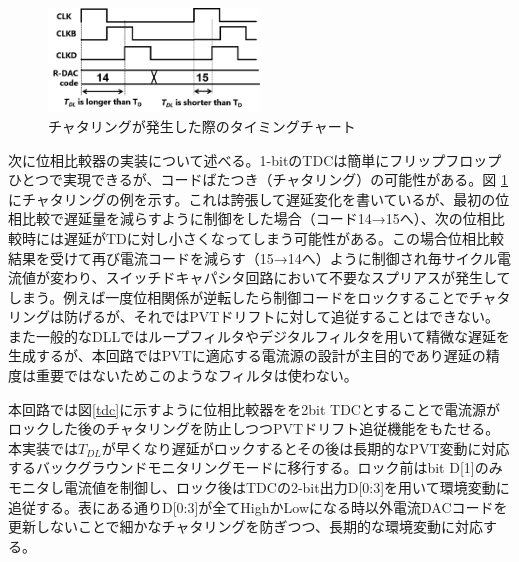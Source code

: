 \documentclass[letterpaper, 10 pt, conference]{ieeeconf}  %
\begin{document}
\begin{figure}[!]
\centering
 \includegraphics[width=0.5\textwidth]{figs/chattering.png}
  \caption{チャタリングが発生した際のタイミングチャート}
\label{chattering}
\end{figure}

次に位相比較器の実装について述べる。1-bitのTDCは簡単にフリップフロップひとつで実現できるが、コードばたつき（チャタリング）の可能性がある。図 \ref{chattering}にチャタリングの例を示す。これは誇張して遅延変化を書いているが、最初の位相比較で遅延量を減らすように制御をした場合（コード14→15へ）、次の位相比較時には遅延がTDに対し小さくなってしまう可能性がある。この場合位相比較結果を受けて再び電流コードを減らす（15→14へ）ように制御され毎サイクル電流値が変わり、スイッチドキャパシタ回路において不要なスプリアスが発生してしまう。例えば一度位相関係が逆転したら制御コードをロックすることでチャタリングは防げるが、それではPVTドリフトに対して追従することはできない。また一般的なDLLではループフィルタ\cite{sidiropoulos1997semidigital}やデジタルフィルタ\cite{kim20172}を用いて精微な遅延を生成するが、本回路ではPVTに適応する電流源の設計が主目的であり遅延の精度は重要ではないためこのようなフィルタは使わない。

本回路では図\ref{tdc}に示すように位相比較器をを2bit TDCとすることで電流源がロックした後のチャタリングを防止しつつPVTドリフト追従機能をもたせる。
本実装では$T_{DL}$が早くなり遅延がロックするとその後は長期的なPVT変動に対応するバックグラウンドモニタリングモードに移行する。ロック前はbit D[1]のみモニタし電流値を制御し、ロック後はTDCの2-bit出力D[0:3]を用いて環境変動に追従する。表にある通りD[0:3]が全てHighかLowになる時以外電流DACコードを更新しないことで細かなチャタリングを防ぎつつ、長期的な環境変動に対応する。
\end{document}
